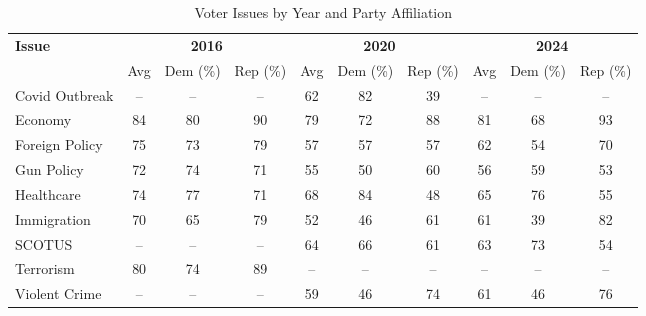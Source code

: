 \documentclass{article}
\begin{document}
\begin{table}[ht]

\centering

\caption{Voter Issues by Year and Party Affiliation}
\label{tab:voter_issues}
\begin{adjustbox}{center}
\begin{tabular}{lccc ccc ccc}
\toprule
\textbf{Issue} & \multicolumn{3}{c}{\textbf{2016}} & \multicolumn{3}{c}{\textbf{2020}} & \multicolumn{3}{c}{\textbf{2024}} \\
 & Avg & Dem (\%) & Rep (\%) & Avg & Dem (\%) & Rep (\%) & Avg & Dem (\%) & Rep (\%) \\
\midrule
Covid Outbreak   & --   & --   & --   & 62   & 82   & 39   & --   & --   & -- \\
Economy          & 84   & 80   & 90   & 79   & 72   & 88   & 81   & 68   & 93 \\
Foreign Policy   & 75   & 73   & 79   & 57   & 57   & 57   & 62   & 54   & 70 \\
Gun Policy       & 72   & 74   & 71   & 55   & 50   & 60   & 56   & 59   & 53 \\
Healthcare       & 74   & 77   & 71   & 68   & 84   & 48   & 65   & 76   & 55 \\
Immigration      & 70   & 65   & 79   & 52   & 46   & 61   & 61   & 39   & 82 \\
SCOTUS           & --   & --   & --   & 64   & 66   & 61   & 63   & 73   & 54 \\
Terrorism        & 80   & 74   & 89   & --   & --   & --   & --   & --   & -- \\
Violent Crime    & --   & --   & --   & 59   & 46   & 74   & 61   & 46   & 76 \\
\bottomrule
\end{tabular}
\end{adjustbox}

\vspace{2pt}

\end{table}
\end{document}
